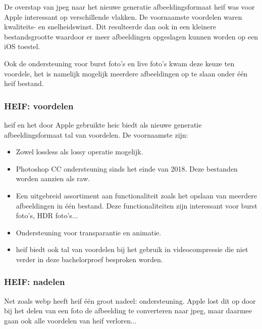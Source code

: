De overstap van \gls{jpeg} naar het nieuwe generatie \gls{afbeeldingsformaat} \gls{heif} was voor Apple interessant op verschillende vlakken. De voornaamste voordelen waren kwaliteits- en snelheidswinst. Dit resulteerde dan ook in een kleinere bestandsgrootte waardoor er meer afbeeldingen opgeslagen kunnen worden op een iOS toestel.

Ook de ondersteuning voor burst foto's en live foto's kwam deze keuze ten voordele, het is namelijk mogelijk meerdere afbeeldingen op te slaan onder één \gls{heif} bestand.

\subsubsection{HEIF: voordelen}
\label{sec:afbeeldingscompressie-heif-voordelen}

\Gls{heif} en het door Apple gebruikte \gls{heic} biedt als nieuwe generatie \gls{afbeeldingsformaat} tal van voordelen. De voornaamste zijn: 

\begin{itemize}
	\item Zowel \gls{lossless} als \gls{lossy} operatie mogelijk.
	
	\item Photoshop CC ondersteuning sinds het einde van 2018. Deze bestanden worden aanzien als \gls{raw}.
	
	\item Een uitgebreid assortiment aan functionaliteit zoals het opslaan van meerdere afbeeldingen in één bestand. Deze functionaliteiten zijn interessant voor burst foto's, HDR foto's...
	
	\item Ondersteuning voor transparantie en animatie.
	
	\item \Gls{heif} biedt ook tal van voordelen bij het gebruik in \gls{videocompressie} die niet verder in deze bachelorproef besproken worden.
\end{itemize}

\subsubsection{HEIF: nadelen}
\label{sec:afbeeldingscompressie-heif-nadelen}

Net zoals \gls{webp} heeft \gls{heif} één groot nadeel: ondersteuning. Apple lost dit op door bij het delen van een foto de afbeelding te converteren naar \gls{jpeg}, maar daarmee gaan ook alle voordelen van \gls{heif} verloren... 

